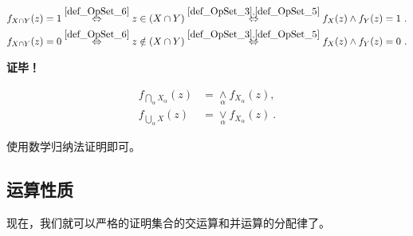 \begin{equation}
\begin{aligned}
&f_{X\cap Y}(z)=1\overset{\autoref{def_OpSet_6} }{\Leftrightarrow} z\in (X\cap  Y)\overset{\autoref{def_OpSet_3} ,\autoref{def_OpSet_5} }{\Leftrightarrow}f_X(z)\land f_Y(z)=1~.\\
&f_{X\cap Y}(z)=0\overset{\autoref{def_OpSet_6} }{\Leftrightarrow} z\notin (X\cap  Y)\overset{\autoref{def_OpSet_3} ,\autoref{def_OpSet_5} }{\Leftrightarrow}f_X(z)\land f_Y(z)=0~.\\
\end{aligned}
\end{equation}

\textbf{证毕！}

\begin{corollary}{}\label{cor_OpSet_1}
\begin{equation}
\begin{aligned}
    f_{\bigcap_\alpha X_\alpha}(z)&=\underset{\alpha}{\land} f_{X_\alpha}(z),\\
f_{\bigcup_\alpha X}(z)&=\underset{\alpha}{\lor} f_{X_\alpha}(z)~.
\end{aligned}
\end{equation}
\end{corollary}
使用数学归纳法证明即可。
\subsection{运算性质}
现在，我们就可以严格的证明集合的交运算和并运算的分配律了。

